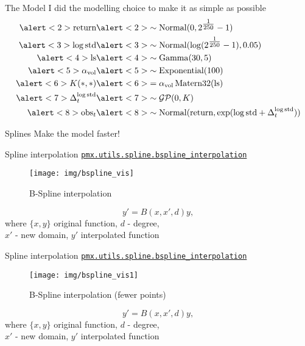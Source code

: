 \documentclass{beamer}
\begin{document}
\begin{frame}{The Model}
I did the modelling choice to make it as simple as possible
    \begin{align*}
        \alert<2>{\text{return} }& \alert<2>{\sim \operatorname{Normal}(0, 2^{\tfrac{1}{250}}-1)}\\
        \alert<3>{\log\text{std}}& \alert<3>{\sim \operatorname{Normal}(\log(2^{\tfrac{1}{250}}-1), 0.05)}\\
        \alert<4>{\text{ls}} & \alert<4>{\sim \operatorname{Gamma}(30, 5) }\\
        \alert<5>{\alpha_{\text{vol}} }& \alert<5>{\sim \operatorname{Exponential}(100)}\\
        \alert<6>{K(*, *) }& \alert<6>{= \alpha_{\text{vol}} \operatorname{Matern32}(\text{ls})}\\
        \alert<7>{\Delta_t^{\log \text{std}} }&\alert<7>{\sim \mathcal{GP}(0, K)}\\
        \alert<8>{\text{obs}_t }&\alert<8>{\sim \operatorname{Normal}(\text{return}, \exp(\log \text{std} + \Delta_t^{\log \text{std}}))}
    \end{align*}
\end{frame}
\begin{frame}{Splines}
    \centering \Huge Make the model faster!
\end{frame}
\begin{frame}{Spline interpolation}
    \href{https://www.pymc.io/projects/experimental/en/latest/api_reference.html\#pymc_experimental.utils.spline.bspline_interpolation}{\texttt{pmx.utils.spline.bspline\_interpolation}}
\begin{figure}
    \centering
    \texttt{[image: img/bspline\_vis]}
    \caption{B-Spline interpolation}
\end{figure}
\begin{equation*}
    y' = B(x, x', d) y,
\end{equation*}
where $\{x, y\}$ original function, $d$ - degree, \\
$x'$ - new domain, $y'$ interpolated function
\end{frame}
\begin{frame}{Spline interpolation}
    \href{https://www.pymc.io/projects/experimental/en/latest/api_reference.html\#pymc_experimental.utils.spline.bspline_interpolation}{\texttt{pmx.utils.spline.bspline\_interpolation}}
\begin{figure}
    \centering
    \texttt{[image: img/bspline\_vis1]}
    \caption{B-Spline interpolation (fewer points)}
\end{figure}
\begin{equation*}
    y' = B(x, x', d) y,
\end{equation*}
where $\{x, y\}$ original function, $d$ - degree, \\
$x'$ - new domain, $y'$ interpolated function
\end{frame}
\end{document}

